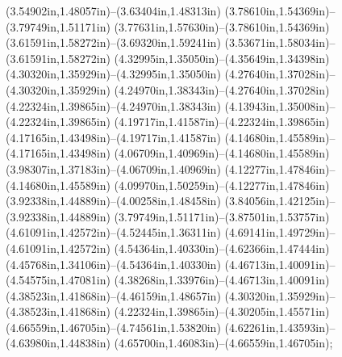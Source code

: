 (3.54902in,1.48057in)--(3.63404in,1.48313in) (3.78610in,1.54369in)--(3.79749in,1.51171in) (3.77631in,1.57630in)--(3.78610in,1.54369in) (3.61591in,1.58272in)--(3.69320in,1.59241in) (3.53671in,1.58034in)--(3.61591in,1.58272in) (4.32995in,1.35050in)--(4.35649in,1.34398in) (4.30320in,1.35929in)--(4.32995in,1.35050in) (4.27640in,1.37028in)--(4.30320in,1.35929in) (4.24970in,1.38343in)--(4.27640in,1.37028in) (4.22324in,1.39865in)--(4.24970in,1.38343in) (4.13943in,1.35008in)--(4.22324in,1.39865in) (4.19717in,1.41587in)--(4.22324in,1.39865in) (4.17165in,1.43498in)--(4.19717in,1.41587in) (4.14680in,1.45589in)--(4.17165in,1.43498in) (4.06709in,1.40969in)--(4.14680in,1.45589in) (3.98307in,1.37183in)--(4.06709in,1.40969in) (4.12277in,1.47846in)--(4.14680in,1.45589in) (4.09970in,1.50259in)--(4.12277in,1.47846in) (3.92338in,1.44889in)--(4.00258in,1.48458in) (3.84056in,1.42125in)--(3.92338in,1.44889in) (3.79749in,1.51171in)--(3.87501in,1.53757in) (4.61091in,1.42572in)--(4.52445in,1.36311in) (4.69141in,1.49729in)--(4.61091in,1.42572in) (4.54364in,1.40330in)--(4.62366in,1.47444in) (4.45768in,1.34106in)--(4.54364in,1.40330in) (4.46713in,1.40091in)--(4.54575in,1.47081in) (4.38268in,1.33976in)--(4.46713in,1.40091in) (4.38523in,1.41868in)--(4.46159in,1.48657in) (4.30320in,1.35929in)--(4.38523in,1.41868in) (4.22324in,1.39865in)--(4.30205in,1.45571in) (4.66559in,1.46705in)--(4.74561in,1.53820in) (4.62261in,1.43593in)--(4.63980in,1.44838in) (4.65700in,1.46083in)--(4.66559in,1.46705in);

